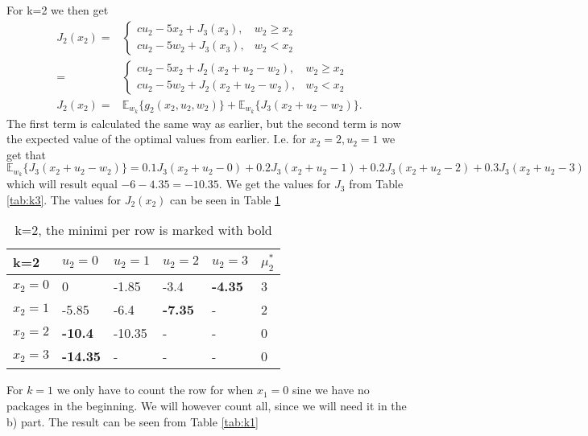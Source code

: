 \documentclass{article}
\begin{document}
For k=2 we then get
\begin{align}
	J_2(x_2) = &
	\begin{cases}
		c u_2 - 5x_2 + J_3(x_3), & w_2 \geq x_2\\
		c u_2 - 5w_2 + J_3(x_3), & w_2 < x_2
	\end{cases}\\
	=& \begin{cases}
		c u_2 - 5x_2 + J_2(x_{2} + u_2 - w_2), & w_2 \geq x_2\\
		c u_2 - 5w_2 + J_2(x_{2} + u_2 - w_2), & w_2 < x_2
	\end{cases}\\
	J_2(x_2) =& \mathbb{E}_{w_k}\lbrace g_2(x_2,u_2,w_2)\rbrace + \mathbb{E}_{w_k}\lbrace J_3(x_{2} + u_2 - w_2)\rbrace.
\end{align}
The first term is calculated the same way as earlier, but the second term is now the expected value of the optimal values from earlier. I.e. for $x_2=2, u_2=1$ we get that 
\begin{equation}
	\mathbb{E}_{w_k}\lbrace J_3(x_{2} + u_2 - w_2)\rbrace = 0.1 J_3(x_{2} + u_2 - 0) + 0.2 J_3(x_{2} + u_2 - 1) + 0.2 J_3(x_{2} + u_2 - 2) + 0.3 J_3(x_{2} + u_2 - 3)
\end{equation}
which will result equal $-6-4.35=-10.35$. We get the values for $J_3$ from Table \ref{tab:k3}. The values for $J_2(x_2)$ can be seen in Table \ref{tab:k2}
\begin{table}[h]
	\centering
	\caption{k=2, the minimi per row is marked with bold}
	\label{tab:k2}
	\begin{tabular}{l|llll|l}
		k=2     & $u_2=0$         & $u_2=1$ & $u_2=2$        & $u_2=3$        & $\mu_2^*$ \\ \hline
		$x_2=0$ & 0               & -1.85   & -3.4           & \textbf{-4.35} & 3         \\
		$x_2=1$ & -5.85           & -6.4    & \textbf{-7.35} & -              & 2         \\
		$x_2=2$ & \textbf{-10.4}  & -10.35  & -              & -              & 0         \\
		$x_2=3$ & \textbf{-14.35} & -       & -              & -              & 0        
	\end{tabular}
\end{table}
For $k=1$ we only have to count the row for when $x_1=0$ sine we have no packages in the beginning. We will however count all, since we will need it in the b) part. The result can be seen from Table \ref{tab:k1}
\end{document}
